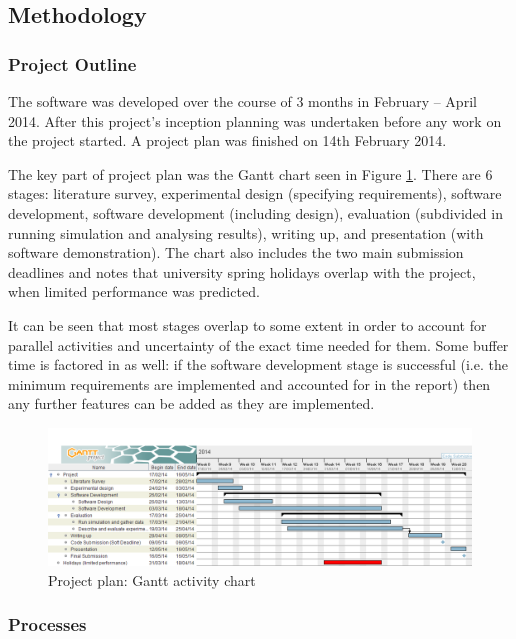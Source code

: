 \subsection{Methodology}

\subsubsection{Project Outline}

The software was developed over the course of 3 months in February -- April
2014. After this project's inception planning was undertaken before any work on
the project started. A project plan was finished on 14th February 2014.

The key part of project plan was the Gantt chart seen in Figure
\ref{figure:gantt}. There are 6 stages: literature survey, experimental design
(specifying requirements), software development, software development
(including design), evaluation (subdivided in running simulation and analysing
results), writing up, and presentation (with software demonstration). The chart
also includes the two main submission deadlines and notes that university
spring holidays overlap with the project, when limited performance was
predicted.

It can be seen that most stages overlap to some extent in order to account for
parallel activities and uncertainty of the exact time needed for them. Some
buffer time is factored in as well: if the software development stage is
successful (i.e. the minimum requirements are implemented and accounted for in
the report) then any further features can be added as they are implemented.

\begin{figure}
  \begin{center}
    \includegraphics[width=\textwidth]{../figures/gantt}
    \caption{
      Project plan: Gantt activity chart
      \label{figure:gantt}
    }
  \end{center}
\end{figure}


\subsubsection{Processes}
\label{sec:design:processes}

